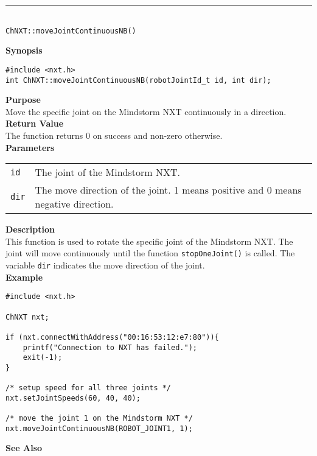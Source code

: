 \noindent
\vspace{5pt}
\rule{4.5in}{0.015in}\\
\noindent
{\LARGE \texttt{ChNXT::moveJointContinuousNB()} }\\


\noindent
{\bf Synopsis}
\vspace{-8pt}
\begin{verbatim}
#include <nxt.h>
int ChNXT::moveJointContinuousNB(robotJointId_t id, int dir);
\end{verbatim}

\noindent
{\bf Purpose}\\
Move the specific joint on the Mindstorm NXT continuously in a direction.\\

\noindent
{\bf Return Value}\\
The function returns 0 on success and non-zero otherwise.\\

\noindent
{\bf Parameters}\\
\vspace{-0.1in}
\begin{description}
\item               
\begin{tabular}{p{15 mm}p{125 mm}}
\texttt{id}      &The joint of the Mindstorm NXT.\\
\texttt{dir}     &The move direction of the joint. 1 means positive and 0 means negative direction.\\
\end{tabular}
\end{description}

\noindent
{\bf Description}\\
This function is used to rotate the specific joint of the Mindstorm NXT. The joint will move continuously until the function 
\texttt{stopOneJoint()} is called. The variable \texttt{dir} indicates the move direction of the joint. \\


\noindent
{\bf Example}
\begin{verbatim}
#include <nxt.h> 

ChNXT nxt;

if (nxt.connectWithAddress("00:16:53:12:e7:80")){
    printf("Connection to NXT has failed.");
    exit(-1);
}
 
/* setup speed for all three joints */
nxt.setJointSpeeds(60, 40, 40);

/* move the joint 1 on the Mindstorm NXT */
nxt.moveJointContinuousNB(ROBOT_JOINT1, 1);
\end{verbatim}

\noindent
{\bf See Also}\\
